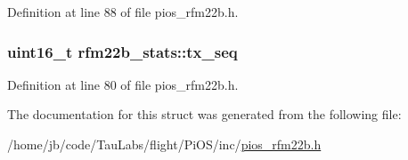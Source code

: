 \-Definition at line 88 of file pios\-\_\-rfm22b.\-h.

\hypertarget{structrfm22b__stats_a8279ef420f8e1d3c6773b8cb528f5122}{
\subsubsection[{tx\-\_\-seq}]{\setlength{\rightskip}{0pt plus 5cm}uint16\-\_\-t {\bf rfm22b\-\_\-stats\-::tx\-\_\-seq}}}\label{structrfm22b__stats_a8279ef420f8e1d3c6773b8cb528f5122}


\-Definition at line 80 of file pios\-\_\-rfm22b.\-h.



\-The documentation for this struct was generated from the following file\-:\begin{DoxyCompactItemize}
\item 
/home/jb/code/\-Tau\-Labs/flight/\-Pi\-O\-S/inc/\hyperlink{pios__rfm22b_8h}{pios\-\_\-rfm22b.\-h}\end{DoxyCompactItemize}
